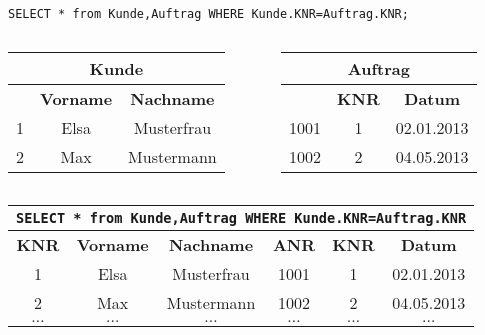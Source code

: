 \begin{frame}[fragile]\frametitle{\insertsection}
\framesubtitle{\insertsubsection}
\\[4pt]
\texttt{SELECT * from Kunde,Auftrag WHERE Kunde.KNR=Auftrag.KNR;}
\begin{columns}
	\begin{column}{.48\textwidth}
		\begin{center}
			\begin{tabular}{|c|c|c|}\hline
				\multicolumn{3}{|c|}{\footnotesize \textbf{Kunde}}\\\hline\hline
				\footnotesize \textbf{\key{KNR}} & \footnotesize \textbf{Vorname} & \footnotesize \textbf{Nachname}  \\\hline
				\footnotesize 1 &\footnotesize Elsa &\footnotesize Musterfrau \\\hline
				\footnotesize 2 & \footnotesize Max &\footnotesize  Mustermann  \\\hline				
			\end{tabular}
		\end{center}
	\end{column}
	\begin{column}{.48\textwidth}
		\begin{center}
			\begin{tabular}{|c|c|c|}\hline
				\multicolumn{3}{|c|}{\footnotesize \textbf{Auftrag}}\\\hline\hline
				\footnotesize \textbf{\key{ANR}} &\footnotesize{\textbf{KNR}} & \footnotesize \textbf{Datum}  \\\hline
				\footnotesize 1001 &\footnotesize 1& \footnotesize 02.01.2013 \\\hline
				\footnotesize 1002 &\footnotesize 2&\footnotesize  04.05.2013  \\\hline
			\end{tabular}
		\end{center}
	\end{column}
\end{columns}
\begin{center}
	\begin{tabular}{|c|c|c|c|c|c|}\hline
		\multicolumn{6}{|c|}{\footnotesize \textbf{\texttt{SELECT * from Kunde,Auftrag WHERE Kunde.KNR=Auftrag.KNR}}}\\\hline\hline
		\footnotesize{\textbf{KNR}} & \footnotesize{\textbf{Vorname}} & \footnotesize{\textbf{Nachname}} &\footnotesize{\textbf{ANR}} &\footnotesize{\textbf{KNR}}& \footnotesize{\textbf{Datum}}\\\hline
		\cellcolor{Green}1 & Elsa & Musterfrau & 1001 & \cellcolor{Green}1 & 02.01.2013\\\hline
		\cellcolor{Green}2 & Max & Mustermann & 1002 & \cellcolor{Green}2 & 04.05.2013\\\hline
		$\dots$ & $\dots$ &$\dots$ & $\dots$ &$\dots$  & $\dots$\\\hline
	\end{tabular}
\end{center}
\end{frame}

